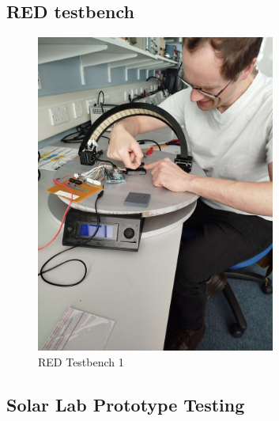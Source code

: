 \subsection{RED testbench}
\begin{figure}[h]
    \centering
    \includegraphics[width=0.7\textwidth]{figures/methodology/The_Arch/building_the_setup.jpg}
    \caption*{RED Testbench 1} 
    \label{fig:RED-Testbench1}
\end{figure}
\newpage
\subsection{Solar Lab Prototype Testing}

